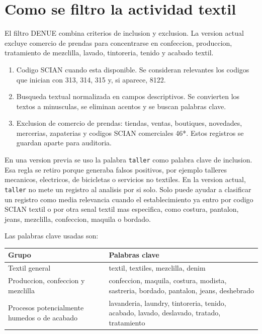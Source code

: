 \documentclass[11pt,letterpaper]{article}
\begin{document}
\section{Como se filtro la actividad textil}

El filtro DENUE combina criterios de inclusion y exclusion. La version actual excluye comercio de prendas para concentrarse en confeccion, produccion, tratamiento de mezclilla, lavado, tintoreria, tenido y acabado textil.

\begin{enumerate}
  \item Codigo SCIAN cuando esta disponible. Se consideran relevantes los codigos que inician con 313, 314, 315 y, si aparece, 8122.
  \item Busqueda textual normalizada en campos descriptivos. Se convierten los textos a minusculas, se eliminan acentos y se buscan palabras clave.
  \item Exclusion de comercio de prendas: tiendas, ventas, boutiques, novedades, mercerias, zapaterias y codigos SCIAN comerciales 46*. Estos registros se guardan aparte para auditoria.
\end{enumerate}

En una version previa se uso la palabra \texttt{taller} como palabra clave de inclusion. Esa regla se retiro porque generaba falsos positivos, por ejemplo talleres mecanicos, electricos, de bicicletas o servicios no textiles. En la version actual, \texttt{taller} no mete un registro al analisis por si solo. Solo puede ayudar a clasificar un registro como media relevancia cuando el establecimiento ya entro por codigo SCIAN textil o por otra senal textil mas especifica, como costura, pantalon, jeans, mezclilla, confeccion, maquila o bordado.

Las palabras clave usadas son:

\begin{longtable}{p{4cm}p{10cm}}
\toprule
Grupo & Palabras clave \\
\midrule
Textil general & textil, textiles, mezclilla, denim \\
Produccion, confeccion y mezclilla & confeccion, maquila, costura, modista, sastreria, bordado, pantalon, jeans, deshebrado \\
Procesos potencialmente humedos o de acabado & lavanderia, laundry, tintoreria, tenido, acabado, lavado, deslavado, tratado, tratamiento \\
\bottomrule
\end{longtable}
\end{document}
